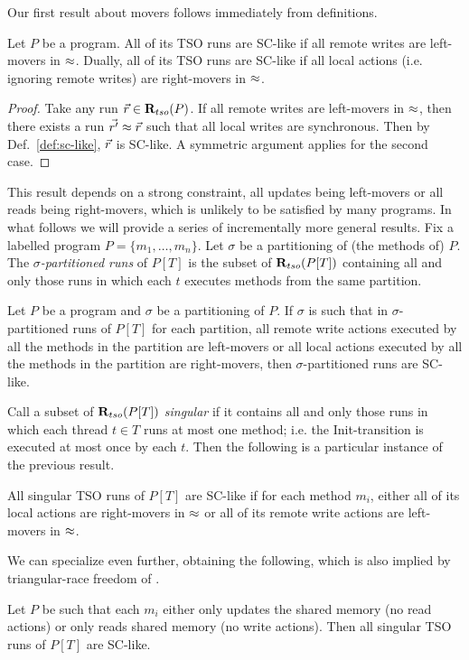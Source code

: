 Our first result about movers follows immediately from definitions.
\begin{lemma}
Let $P$ be a program.
All of its TSO runs are SC-like if all remote writes are left-movers in $\approx$.
Dually, all of its TSO runs are SC-like if all local actions (i.e. ignoring remote writes) are right-movers in $\approx$.
\end{lemma}
\begin{proof}
Take any run $\vec{r}\in \mathbf{R}_{tso}(P)$.
If all remote writes are left-movers in $\approx$, then there exists a run $\vec{r'}\approx\vec{r}$ such that all local writes are synchronous. 
Then by Def.~\ref{def:sc-like}, $\vec{r}$ is SC-like.
A symmetric argument applies for the second case.
\end{proof}

This result depends on a strong constraint, all updates being left-movers or all reads being right-movers, which is unlikely to be satisfied by many programs.
In what follows we will provide a series of incrementally more general results.
Fix a labelled program $P=\{m_1,\ldots,m_n\}$.
Let $\sigma$ be a partitioning of (the methods of) $P$.
The {\em $\sigma$-partitioned runs} of $P[T]$ is the subset of $\mathbf{R}_{tso}(P[T])$ containing all and only those runs in which each $t$ executes methods from the same partition.
\begin{lemma}
Let $P$ be a program and $\sigma$ be a partitioning of $P$.
If $\sigma$ is such that in $\sigma$-partitioned runs of $P[T]$ for each partition, all remote write actions executed by all the methods in the partition are left-movers or all local actions executed by all the methods in the partition are right-movers, then $\sigma$-partitioned runs are SC-like.
\end{lemma}
Call a subset of $\mathbf{R}_{tso}(P[T])$ {\em singular} if it contains all and only those runs in which each thread $t\in T$ runs at most one method; i.e. the {\sc\small Init}-transition is executed at most once by each $t$.
Then the following is a particular instance of the previous result.
\begin{corollary}
All singular TSO runs of $P[T]$ are SC-like if for each method $m_i$, either all of its local actions are right-movers in $\approx$ or all of its remote write actions are left-movers in $\approx$. 
\end{corollary}
We can specialize even further, obtaining the following, which is also implied by triangular-race freedom of \cite{Owe2009}.
\begin{corollary}
Let $P$ be such that each $m_i$ either only updates the shared memory (no read actions) or only reads shared memory (no write actions).
Then all singular TSO runs of $P[T]$ are SC-like.
\end{corollary}

